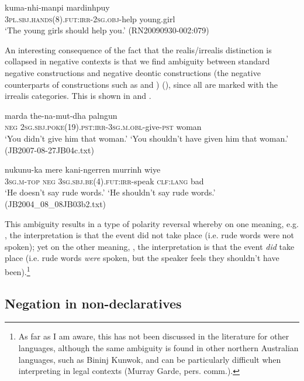 \documentclass[output=paper,colorlinks,citecolor=brown]{langscibook}
\begin{document}
\ea\label{ex:mur:16}
    \gll kuma-nhi-manpi mardinhpuy\\
         \textsc{3pl.sbj.hands(8).fut:irr-2sg.obj}{}-help young.girl\\
    \glt ‘The young girls should help you.’ (RN20090930-002:079)
\z 

An interesting consequence of the fact that the realis/irrealis distinction is collapsed in negative contexts is that we find ambiguity between standard negative constructions and negative deontic constructions (the negative counterparts of constructions such as  and ) (\citealt{NordlingerCaudal2012}), since all are marked with the irrealis categories. This is shown in  and .

\newpage
\ea\label{ex:mur:17} 
    \gll  marda the-na-mut-dha palngun\\
         \textsc{neg} \textsc{2sg.sbj.poke(19).pst:irr-3sg.m.obl-}give\textsc{{}-pst} woman\\
    \ea\label{ex:mur:17a}
        \glt ‘You didn’t give him that woman.’
    \ex\label{ex:mur:17b}
        \glt ‘You shouldn't have given him that woman.’ (JB2007-08-27JB04c.txt)
    \z
\z 

\ea\label{ex:mur:18}
    \gll nukunu-ka mere kani-ngerren murrinh wiye\\
         \textsc{3sg.m-top} \textsc{neg} \textsc{3sg.sbj.be(4).fut:irr-}speak \textsc{clf:lang} bad\\   
    \ea\label{ex:mur:18a}
        \glt ‘He doesn’t say rude words.’
    \ex\label{ex:mur:18b}
        \glt ‘He shouldn’t say rude words.’ (JB2004\_08\_08JB03b2.txt)
    \z
\z 

This ambiguity results in a type of polarity reversal whereby on one meaning, e.g. , the interpretation is that the event did not take place (i.e. rude words were not spoken); yet on the other meaning, , the interpretation is that the event \textit{did} take place (i.e. rude words \textit{were} spoken, but the speaker feels they shouldn’t have been).\footnote{As far as I am aware, this has not been discussed in the literature for other languages, although the same ambiguity is found in other northern Australian languages, such as Bininj Kunwok, and can be particularly difficult when interpreting in legal contexts (Murray Garde, pers. comm.).} 

\subsection{Negation in non-declaratives} \label{sec:mur:2.2}
\end{document}
